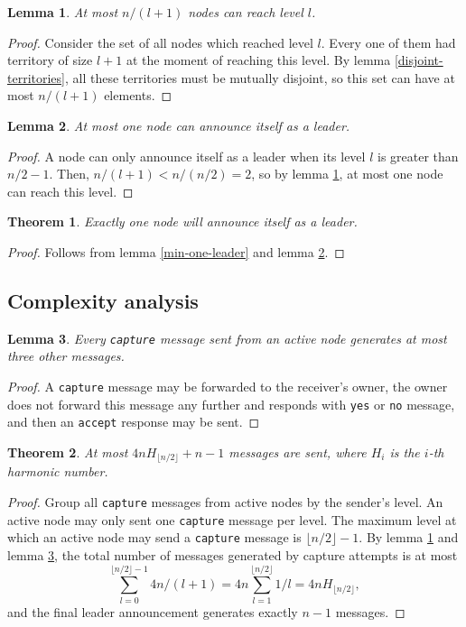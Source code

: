 \documentclass[a4paper,12pt]{article}
\newtheorem{lemma}{Lemma}
\newtheorem{theorem}{Theorem}
\newcommand{\tcapture}{\texttt{capture}\xspace}
\newcommand{\taccept}{\texttt{accept}\xspace}
\newcommand{\tyes}{\texttt{yes}\xspace}
\newcommand{\tno}{\texttt{no}\xspace}
\begin{document}
\begin{lemma}\label{max-for-level}
    At most $n / (l + 1)$ nodes can reach level $l$.
\end{lemma}
\begin{proof}
    Consider the set of all nodes which reached level $l$.
    Every one of them had territory of size $l + 1$ at the moment of reaching this level.
    By lemma \ref{disjoint-territories}, all these territories must be mutually disjoint,
    so this set can have at most $n / (l + 1)$ elements.
\end{proof}

\begin{lemma}\label{max-one-leader}
    At most one node can announce itself as a leader.
\end{lemma}
\begin{proof}
    A node can only announce itself as a leader when its level $l$ is greater than $n / 2 - 1$.
    Then, $n / (l + 1) < n / (n / 2) = 2$, so by lemma \ref{max-for-level}, at most one node can reach this level.
\end{proof}

\begin{theorem}\label{one-leader}
    Exactly one node will announce itself as a leader.
\end{theorem}
\begin{proof}
    Follows from lemma \ref{min-one-leader} and lemma \ref{max-one-leader}.
\end{proof}

\subsection*{Complexity analysis}

\begin{lemma}\label{capture-messages}
    Every \tcapture message sent from an active node generates at most three other messages.
\end{lemma}
\begin{proof}
    A \tcapture message may be forwarded to the receiver's owner,
    the owner does not forward this message any further and responds with \tyes or \tno message,
    and then an \taccept response may be sent.
\end{proof}

\begin{theorem}\label{messages}
    At most $4 n H_{\lfloor n / 2 \rfloor} + n - 1$ messages are sent,
    where $H_i$ is the $i$-th harmonic number.
\end{theorem}
\begin{proof}
    Group all \tcapture messages from active nodes by the sender's level.
    An active node may only sent one \tcapture message per level.
    The maximum level at which an active node may send a \tcapture message is $\lfloor n / 2 \rfloor - 1$.
    By lemma \ref{max-for-level} and lemma \ref{capture-messages},
    the total number of messages generated by capture attempts is at most
    $$\sum_{l=0}^{\lfloor n / 2 \rfloor - 1} 4 n / (l + 1) = 4 n \sum_{l=1}^{\lfloor n / 2 \rfloor} 1 / l = 4 n H_{\lfloor n / 2 \rfloor},$$
    and the final leader announcement generates exactly $n - 1$ messages.
\end{proof}
\end{document}
